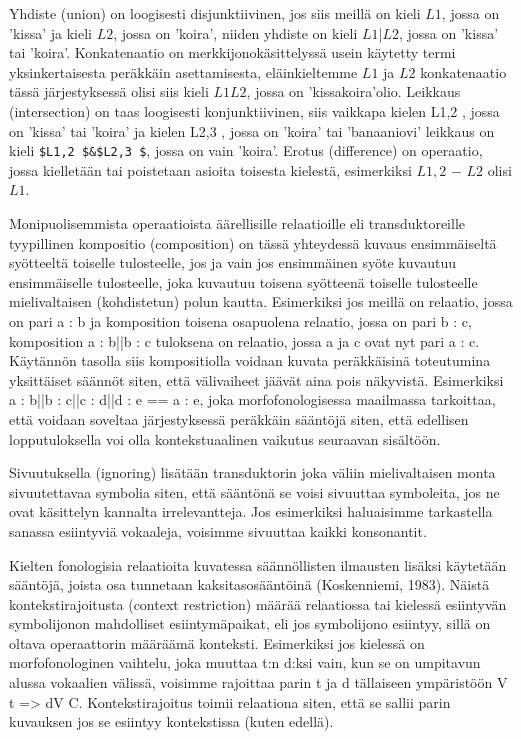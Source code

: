 \documentclass[free]{flammie}
\begin{document}
Yhdiste (union) on loogisesti disjunktiivinen, jos siis meillä on kieli $L1 $, jossa on ’kissa’ ja kieli $L2 $, jossa on ’koira’, niiden yhdiste on kieli $L1 $|$L2 $,
jossa on ’kissa’ tai ’koira’. Konkatenaatio on merkkijonokäsittelyssä usein käytetty termi yksinkertaisesta peräkkäin asettamisesta, eläinkieltemme $L1 $ ja $L2 $
konkatenaatio tässä järjestyksessä olisi siis kieli $L1 $$L2 $, jossa on
’kissakoira’olio. Leikkaus (intersection) on taas loogisesti konjunktiivinen,
siis vaikkapa kielen L1,2 , jossa on ’kissa’ tai ’koira’ ja kielen L2,3 , jossa
on ’koira’ tai ’banaaniovi’ leikkaus on kieli \verb|$L1,2 $&$L2,3 $|, jossa on vain ’koira’. Erotus (difference)
on operaatio, jossa kielletään tai poistetaan asioita toisesta kielestä, esimerkiksi
$L1,2 $ − $L2 $ olisi $L1 $.

Monipuolisemmista operaatioista äärellisille relaatioille eli transduktoreille tyypillinen kompositio (composition) on tässä yhteydessä kuvaus ensimmäiseltä syötteeltä toiselle tulosteelle, jos ja vain jos ensimmäinen syöte kuvautuu ensimmäiselle tulosteelle, joka kuvautuu toisena syötteenä toiselle tulosteelle mielivaltaisen (kohdistetun) polun kautta. Esimerkiksi jos meillä on relaatio, jossa on pari
a : b ja komposition toisena osapuolena relaatio, jossa on pari b : c, komposition a : b||b : c tuloksena on relaatio, jossa a ja c ovat nyt pari a : c. Käytännön tasolla siis kompositiolla voidaan kuvata peräkkäisinä toteutumina yksittäiset säännöt siten, että välivaiheet jäävät aina pois näkyvistä. Esimerkiksi
a : b||b : c||c : d||d : e == a : e, joka morfofonologisessa maailmassa tarkoittaa, että voidaan soveltaa järjestyksessä peräkkäin sääntöjä siten, että edellisen lopputuloksella voi olla kontekstuaalinen vaikutus seuraavan sisältöön.

Sivuutuksella (ignoring) lisätään transduktorin joka väliin mielivaltaisen monta sivuutettavaa symbolia siten, että sääntönä se voisi sivuuttaa symboleita, jos ne ovat
käsittelyn kannalta irrelevantteja. Jos esimerkiksi haluaisimme tarkastella sanassa
esiintyviä vokaaleja, voisimme sivuuttaa kaikki konsonantit.

Kielten fonologisia relaatioita kuvatessa säännöllisten ilmausten lisäksi käytetään
sääntöjä, joista osa tunnetaan kaksitasosääntöinä (Koskenniemi, 1983). Näistä
kontekstirajoitusta (context restriction) määrää relaatiossa tai kielessä esiintyvän
symbolijonon mahdolliset esiintymäpaikat, eli jos symbolijono esiintyy, sillä on
oltava operaattorin määräämä konteksti. Esimerkiksi jos kielessä on morfofonologinen vaihtelu, joka muuttaa t:n d:ksi vain, kun se on umpitavun alussa vokaalien
välissä, voisimme rajoittaa parin t ja d tällaiseen ympäristöön V t => dV C. Kontekstirajoitus toimii relaationa siten, että se sallii parin kuvauksen jos se esiintyy
kontekstissa (kuten edellä).
\end{document}
